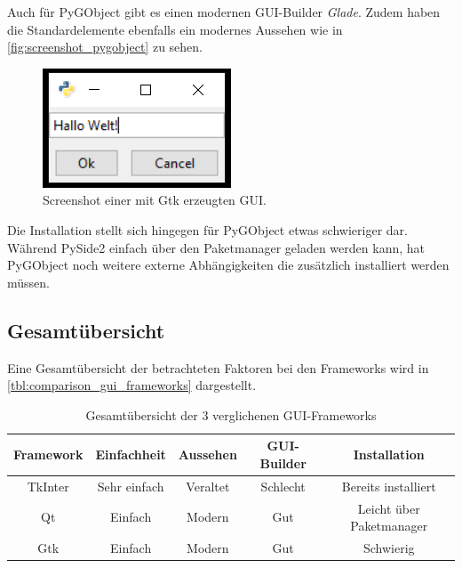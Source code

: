 Auch für PyGObject gibt es einen modernen \ac{GUI}-Builder \textit{Glade}. Zudem haben die Standardelemente ebenfalls ein modernes Aussehen wie in \autoref{fig:screenshot_pygobject} zu sehen.

\begin{figure}[h]
\begin{center}
\includegraphics[scale=0.7]{images/pygobject_screenshot.png}
\caption{Screenshot einer mit Gtk erzeugten GUI.}
\label{fig:screenshot_pygobject}
\end{center}
\end{figure}

Die Installation stellt sich hingegen für PyGObject etwas schwieriger dar. Während PySide2 einfach über den Paketmanager geladen werden kann, hat PyGObject noch weitere externe Abhängigkeiten die zusätzlich installiert werden müssen.

\subsection{Gesamtübersicht}
Eine Gesamtübersicht der betrachteten Faktoren bei den Frameworks wird in \autoref{tbl:comparison_gui_frameworks} dargestellt.
\begin{table}[h]
\begin{center}
\begin{tabular}{c|c|c|c|c}
Framework & Einfachheit & Aussehen & GUI-Builder & Installation \\
\hline
TkInter & {\cellcolor{green!50}}Sehr einfach & \cellcolor{red!50}Veraltet & \cellcolor{red!50}Schlecht & \cellcolor{green!50}Bereits installiert \\
Qt & \cellcolor{green!25}Einfach & \cellcolor{green!50}Modern & \cellcolor{green!50}Gut & \cellcolor{green!25}Leicht über Paketmanager \\
Gtk & \cellcolor{green!25}Einfach & \cellcolor{green!50}Modern & \cellcolor{green!50}Gut & \cellcolor{red!50}Schwierig
\end{tabular}
\end{center}
\caption{\label{tbl:comparison_gui_frameworks}Gesamtübersicht der 3 verglichenen GUI-Frameworks}
\end{table}

